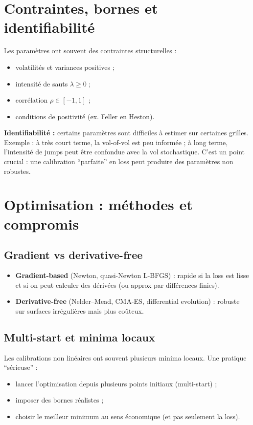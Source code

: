 \documentclass[11pt,a4paper]{report}
\newcommand{\1}{\mathbbm{1}}
\theoremstyle{definition}
\theoremstyle{plain}
\theoremstyle{remark}
\begin{document}
\section{Contraintes, bornes et identifiabilité}
\label{sec:constraints}

Les paramètres ont souvent des contraintes structurelles :
\begin{itemize}
  \item volatilités et variances positives ;
  \item intensité de sauts $\lambda\ge 0$ ;
  \item corrélation $\rho\in[-1,1]$ ;
  \item conditions de positivité (ex. Feller en Heston).
\end{itemize}

\textbf{Identifiabilité :} certains paramètres sont difficiles à estimer sur certaines grilles.
Exemple : à très court terme, la vol-of-vol est peu informée ; à long terme, l'intensité de jumps peut être confondue avec la vol stochastique.
C'est un point crucial : une calibration ``parfaite'' en loss peut produire des paramètres non robustes.

\section{Optimisation : méthodes et compromis}
\subsection{Gradient vs derivative-free}
\begin{itemize}
\item \textbf{Gradient-based} (Newton, quasi-Newton L-BFGS) : rapide si la loss est lisse et si on peut calculer des dérivées (ou approx par différences finies).
\item \textbf{Derivative-free} (Nelder--Mead, CMA-ES, differential evolution) : robuste sur surfaces irrégulières mais plus coûteux.
\end{itemize}

\subsection{Multi-start et minima locaux}
Les calibrations non linéaires ont souvent plusieurs minima locaux.
Une pratique ``sérieuse'' :
\begin{itemize}
  \item lancer l'optimisation depuis plusieurs points initiaux (multi-start) ;
  \item imposer des bornes réalistes ;
  \item choisir le meilleur minimum au sens économique (et pas seulement la loss).
\end{itemize}
\end{document}
